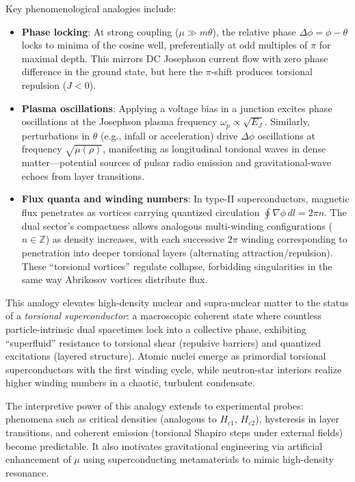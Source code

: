 \documentclass[a4paper]{article}
\begin{document}
Key phenomenological analogies include:

\begin{itemize}
  \item \textbf{Phase locking}: At strong coupling ($\mu \gg m \theta$), the relative phase $\Delta\phi = \phi - \theta$ locks to minima of the cosine well, preferentially at odd multiples of $\pi$ for maximal depth. This mirrors DC Josephson current flow with zero phase difference in the ground state, but here the $\pi$-shift produces torsional repulsion ($J < 0$).
  
  \item \textbf{Plasma oscillations}: Applying a voltage bias in a junction excites phase oscillations at the Josephson plasma frequency $\omega_p \propto \sqrt{E_J}$. Similarly, perturbations in $\theta$ (e.g., infall or acceleration) drive $\Delta\phi$ oscillations at frequency $\sqrt{\mu(\rho)}$, manifesting as longitudinal torsional waves in dense matter—potential sources of pulsar radio emission and gravitational-wave echoes from layer transitions.
  
  \item \textbf{Flux quanta and winding numbers}: In type-II superconductors, magnetic flux penetrates as vortices carrying quantized circulation $\oint \nabla\phi \, dl = 2\pi n$. The dual sector's compactness allows analogous multi-winding configurations ($n \in \mathbb{Z}$) as density increases, with each successive $2\pi$ winding corresponding to penetration into deeper torsional layers (alternating attraction/repulsion). These ``torsional vortices'' regulate collapse, forbidding singularities in the same way Abrikosov vortices distribute flux.
\end{itemize}

This analogy elevates high-density nuclear and supra-nuclear matter to the status of a \emph{torsional superconductor}: a macroscopic coherent state where countless particle-intrinsic dual spacetimes lock into a collective phase, exhibiting ``superfluid'' resistance to torsional shear (repulsive barriers) and quantized excitations (layered structure). Atomic nuclei emerge as primordial torsional superconductors with the first winding cycle, while neutron-star interiors realize higher winding numbers in a chaotic, turbulent condensate.

The interpretive power of this analogy extends to experimental probes: phenomena such as critical densities (analogous to $H_{c1}$, $H_{c2}$), hysteresis in layer transitions, and coherent emission (torsional Shapiro steps under external fields) become predictable. It also motivates gravitational engineering via artificial enhancement of $\mu$ using superconducting metamaterials to mimic high-density resonance.
\end{document}
